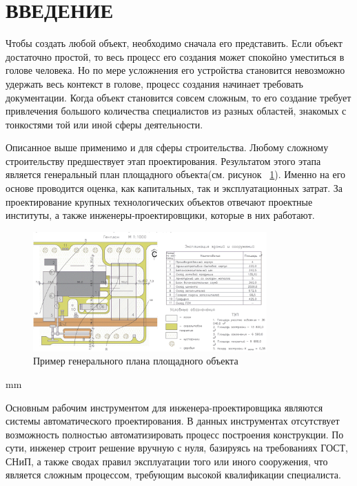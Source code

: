 \section*{\large{ВВЕДЕНИЕ}}


Чтобы создать любой объект, необходимо сначала его представить.
Если объект достаточно простой, то весь процесс его создания может спокойно уместиться в голове человека.
Но по мере усложнения его устройства становится невозможно удержать весь контекст в голове,
процесс создания начинает требовать документации.
Когда объект становится совсем сложным, то его создание требует привлечения большого количества специалистов из разных
областей, знакомых с тонкостями той или иной сферы деятельности.

Описанное выше применимо и для сферы строительства.
Любому сложному строительству предшествует этап проектирования.
Результатом этого этапа является генеральный план площадного объекта(см. рисунок \ \ref{pic:introduction__site-plan}).
Именно на его основе проводится оценка, как капитальных, так и эксплуатационных затрат.
За проектирование крупных технологических объектов отвечают проектные институты,
а также инженеры-проектировщики, которые в них работают.

\begin{figure}[H]
	\vspace*{-0.4 cm}
	\includegraphics[width=0.8\textwidth]{introduction/pictures/site_plan}
	\caption{Пример генерального плана площадного объекта}
	\label{pic:introduction__site-plan}
\end{figure}
 mm

Основным рабочим инструментом для инженера-проектировщика являются системы автоматического проектирования.
В данных инструментах отсутствует возможность полностью автоматизировать процесс построения конструкции.
По сути, инженер строит решение вручную с нуля, базируясь на требованиях ГОСТ, СНиП, а также сводах правил
эксплуатации того или иного сооружения, что является сложным процессом, требующим высокой квалификации специалиста.
